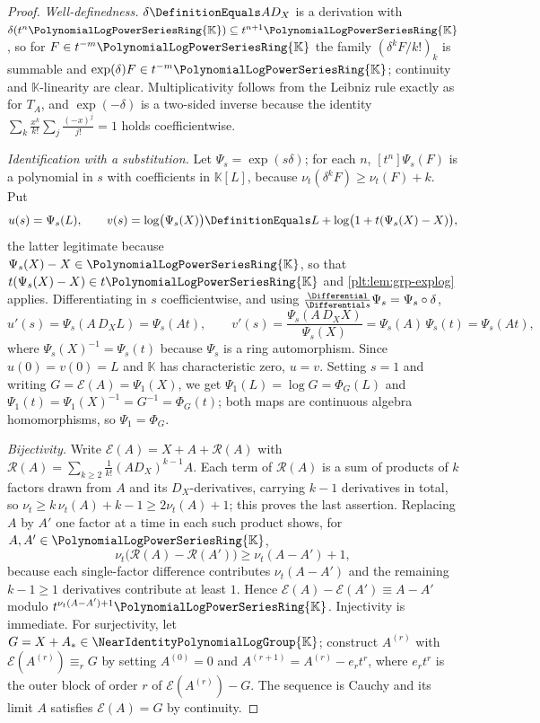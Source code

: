 \documentclass[11pt,oneside]{article}
\theoremstyle{plain}
\theoremstyle{definition}
\theoremstyle{remark}
\newcommand{\K}{\mathbb{K}}
\newcommand{\PLpow}{\PolynomialLogPowerSeriesRing{\K}}   %
\newcommand{\Gnear}{\NearIdentityPolynomialLogGroup{\K}} %
\newcommand{\ordt}{\nu_{t}}                              %
\newcommand{\DX}{D_{X}}                                  %
\begin{document}
\begin{proof}
\emph{Well-definedness.}  \(\delta\DefinitionEquals A\DX\) is a derivation with
\(\delta(t^n\PLpow)\subseteq t^{n+1}\PLpow\), so for \(F\in t^{-m}\PLpow\) the
family \((\delta^kF/k!)_k\) is summable and \(\exp(\delta)F\in t^{-m}\PLpow\);
continuity and \(\K\)-linearity are clear.  Multiplicativity follows from the
Leibniz rule exactly as for \(T_A\), and \(\exp(-\delta)\) is a two-sided
inverse because the identity
\(\sum_{k}\frac{x^k}{k!}\sum_j\frac{(-x)^j}{j!}=1\) holds coefficientwise.

\emph{Identification with a substitution.}  Let \(\Psi_s=\exp(s\delta)\); for
each \(n\), \([t^n]\Psi_s(F)\) is a polynomial in \(s\) with coefficients in
\(\K[L]\), because \(\ordt(\delta^kF)\ge\ordt(F)+k\).  Put
\[
  u(s)=\Psi_s(L),
  \qquad
  v(s)=\log\bigl(\Psi_s(X)\bigr)
      \DefinitionEquals L+\log\bigl(1+t(\Psi_s(X)-X)\bigr),
\]
the latter legitimate because \(\Psi_s(X)-X\in\PLpow\), so that
\(t(\Psi_s(X)-X)\in t\PLpow\) and \cref{plt:lem:grp-explog} applies.
Differentiating in \(s\) coefficientwise, and using
\(\frac{\Differential}{\Differential s}\Psi_s=\Psi_s\circ\delta\),
\[
  u'(s)=\Psi_s(A\,\DX L)=\Psi_s(At),
  \qquad
  v'(s)=\frac{\Psi_s(A\,\DX X)}{\Psi_s(X)}
       =\Psi_s(A)\,\Psi_s(t)=\Psi_s(At),
\]
where \(\Psi_s(X)^{-1}=\Psi_s(t)\) because \(\Psi_s\) is a ring automorphism.
Since \(u(0)=v(0)=L\) and \(\K\) has characteristic zero, \(u=v\).  Setting
\(s=1\) and writing \(G=\mathcal E(A)=\Psi_1(X)\), we get
\(\Psi_1(L)=\log G=\Phi_G(L)\) and
\(\Psi_1(t)=\Psi_1(X)^{-1}=G^{-1}=\Phi_G(t)\); both maps are continuous algebra
homomorphisms, so \(\Psi_1=\Phi_G\).

\emph{Bijectivity.}  Write \(\mathcal E(A)=X+A+\mathcal R(A)\) with
\(\mathcal R(A)=\sum_{k\ge2}\frac1{k!}(A\DX)^{k-1}A\).  Each term of
\(\mathcal R(A)\) is a sum of products of \(k\) factors drawn from \(A\) and
its \(\DX\)-derivatives, carrying \(k-1\) derivatives in total, so
\(\ordt\ge k\,\ordt(A)+k-1\ge2\ordt(A)+1\); this proves the last assertion.
Replacing \(A\) by \(A'\) one factor at a time in each such product shows, for
\(A,A'\in\PLpow\),
\[
  \ordt\bigl(\mathcal R(A)-\mathcal R(A')\bigr)\ge\ordt(A-A')+1,
\]
because each single-factor difference contributes \(\ordt(A-A')\) and the
remaining \(k-1\ge1\) derivatives contribute at least \(1\).  Hence
\(\mathcal E(A)-\mathcal E(A')\equiv A-A'\) modulo
\(t^{\ordt(A-A')+1}\PLpow\).  Injectivity is immediate.  For surjectivity, let
\(G=X+A_\ast\in\Gnear\); construct \(A^{(r)}\) with
\(\mathcal E(A^{(r)})\equiv_rG\) by setting \(A^{(0)}=0\) and
\(A^{(r+1)}=A^{(r)}-e_rt^r\), where \(e_rt^r\) is the outer block of order
\(r\) of \(\mathcal E(A^{(r)})-G\).  The sequence is Cauchy and its limit
\(A\) satisfies \(\mathcal E(A)=G\) by continuity.
\end{proof}
\end{document}
